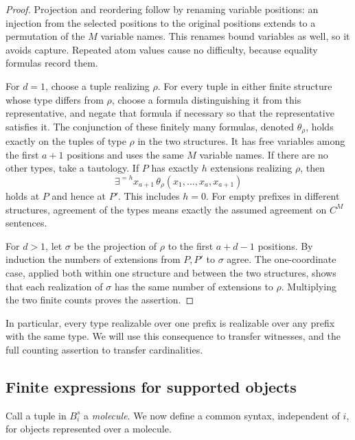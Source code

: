 \begin{proof}
Projection and reordering follow by renaming variable positions:
an injection from the selected positions to the original positions
extends to a permutation of the $M$ variable names.  This renames bound
variables as well, so it avoids capture.  Repeated atom values cause
no difficulty, because equality formulas record them.

For $d=1$, choose a tuple realizing $\rho$.  For every tuple in either
finite structure whose type differs from $\rho$, choose a formula
distinguishing it from this representative, and negate that formula
if necessary so that the representative satisfies it.  The conjunction
of these finitely many formulas, denoted $\theta_\rho$, holds exactly
on the tuples of type $\rho$ in the two structures.  It has free
variables among the first $a+1$ positions and uses the same $M$ variable
names.  If there are no other types, take a tautology.
If $P$ has exactly $h$ extensions realizing $\rho$, then
\[
       \exists^{=h}x_{a+1}\,
       \theta_\rho(x_1,\ldots,x_a,x_{a+1})
\]
holds at $P$ and hence at $P'$.  This includes $h=0$.
For empty prefixes in different structures, agreement of the types
means exactly the assumed agreement on $C^M$ sentences.

For $d>1$, let $\sigma$ be the projection of $\rho$ to the first
$a+d-1$ positions.  By induction the numbers of extensions from $P,P'$
to $\sigma$ agree.  The one-coordinate case, applied both within one
structure and between the two structures, shows that each realization
of $\sigma$ has the same number of extensions to $\rho$.
Multiplying the two finite counts proves the assertion.
\end{proof}

In particular, every type realizable over one prefix is realizable over
any prefix with the same type.  We will use this consequence to transfer
witnesses, and the full counting assertion to transfer cardinalities.

\subsection{Finite expressions for supported objects}

Call a tuple in $B_i^s$ a \emph{molecule}.  We now define a common syntax,
independent of $i$, for objects represented over a molecule.

